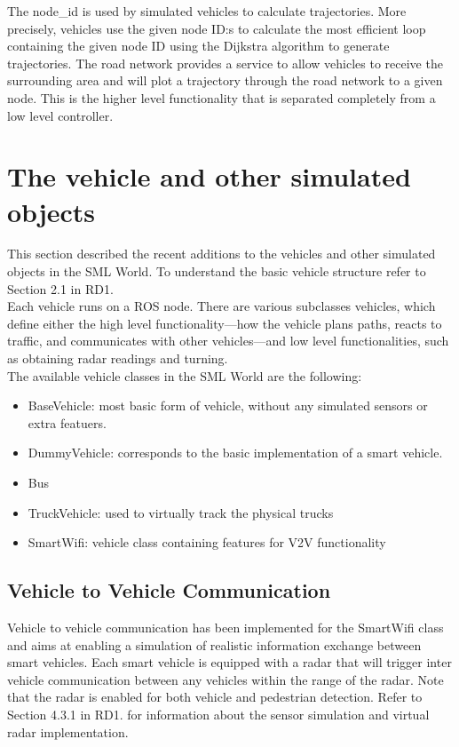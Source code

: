 \documentclass[11pt,a4paper]{book}
\begin{document}
\noindent The node\_id is used by simulated vehicles to calculate trajectories. More precisely, vehicles use the given node ID:s to calculate the most efficient loop containing the given node ID using the Dijkstra algorithm to generate trajectories. The road network provides a service to allow vehicles to receive the surrounding area and will plot a trajectory through the road network to a given node. This is the higher level functionality that is separated completely from a low level controller.


\section{The vehicle and other simulated objects}
\label{sec:vehicles}
This section described the recent additions to the vehicles and other simulated objects in the SML World. To understand the basic vehicle structure refer to Section 2.1 in RD1. \\

\noindent Each vehicle runs on a ROS node. There are various subclasses vehicles, which define either the high level functionality—how the vehicle plans paths, reacts to traffic, and communicates with other vehicles—and low level functionalities, such as obtaining radar readings and turning. \\

\noindent The available vehicle classes in the SML World are the following:
\begin{itemize}
\item BaseVehicle: most basic form of vehicle, without any simulated sensors or extra featuers.
\item DummyVehicle: corresponds to the basic implementation of a smart vehicle.
\item Bus
\item TruckVehicle: used to virtually track the physical trucks
\item SmartWifi: vehicle class containing features for V2V functionality
\end{itemize}

\subsection{Vehicle to Vehicle Communication}
Vehicle to vehicle communication has been implemented for the SmartWifi class and aims at enabling a simulation of realistic information exchange between smart vehicles. Each smart vehicle is equipped with a radar that will trigger inter vehicle communication between any vehicles within the range of the radar. Note that the radar is enabled for both vehicle and pedestrian detection. Refer to Section 4.3.1 in RD1. for information about the sensor simulation and virtual radar implementation. \\
\end{document}
